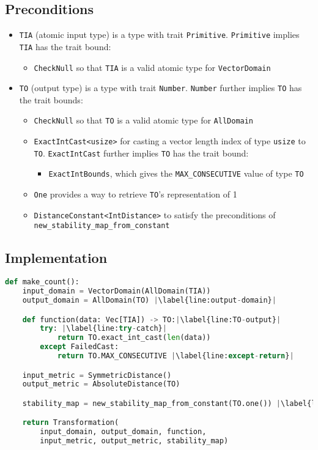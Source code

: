 \documentclass{article}
\begin{document}
\subsection*{Preconditions}
\begin{itemize}

    \item \texttt{TIA} (atomic input type) is a type with trait \texttt{Primitive}. \texttt{Primitive} implies \texttt{TIA} has the trait bound:
    \begin{itemize}
        \item \texttt{CheckNull} so that \texttt{TIA} is a valid atomic type for \texttt{VectorDomain}
    \end{itemize}

    \item \texttt{TO} (output type) is a type with trait \texttt{Number}. \texttt{Number} further implies \texttt{TO} has the trait bounds:
    \begin{itemize}
        \item \texttt{CheckNull} so that \texttt{TO} is a valid atomic type for \texttt{AllDomain}
        \item \texttt{ExactIntCast<usize>} for casting a vector length index of type \texttt{usize} to \texttt{TO}. \texttt{ExactIntCast} further implies \texttt{TO} has the trait bound:
        \begin{itemize}
            \item \texttt{ExactIntBounds}, which gives the \texttt{MAX\_CONSECUTIVE} value of type \texttt{TO}
        \end{itemize}
        
        \item \texttt{One} provides a way to retrieve \texttt{TO}'s representation of 1
        \item \texttt{DistanceConstant<IntDistance>} to satisfy the preconditions of \texttt{new\_stability\_map\_from\_constant}
    \end{itemize}
\end{itemize}

\subsection*{Implementation}
\begin{lstlisting}[language = Python, escapechar=|]
def make_count():
    input_domain = VectorDomain(AllDomain(TIA))
    output_domain = AllDomain(TO) |\label{line:output-domain}|

    def function(data: Vec[TIA]) -> TO:|\label{line:TO-output}|
        try: |\label{line:try-catch}|
            return TO.exact_int_cast(len(data))
        except FailedCast:
            return TO.MAX_CONSECUTIVE |\label{line:except-return}|

    input_metric = SymmetricDistance()
    output_metric = AbsoluteDistance(TO)

    stability_map = new_stability_map_from_constant(TO.one()) |\label{line:stability-map}|

    return Transformation(
        input_domain, output_domain, function,
        input_metric, output_metric, stability_map)
\end{lstlisting}
\end{document}
